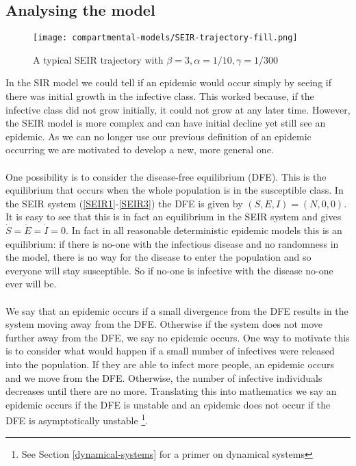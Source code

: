 \subsection{Analysing the model}
\begin{figure}
	\centering
	\texttt{[image: compartmental-models/SEIR-trajectory-fill.png]}
	\caption{A typical SEIR trajectory with $\beta=3,\alpha=1/10,\gamma=1/300$}
\end{figure}
In the SIR model we could tell if an epidemic would occur simply by seeing if there was initial growth in the infective class. This worked because, if the infective class did not grow initially, it could not grow at any later time. However, the SEIR model is more complex and can have initial decline yet still see an epidemic. As we can no longer use our previous definition of an epidemic occurring we are motivated to develop a new, more general one.\\
\\
One possibility is to consider the disease-free equilibrium (DFE). This is the equilibrium that occurs when the whole population is in the susceptible class. In the SEIR system (\ref{SEIR1}-\ref{SEIR3}) the DFE is given by $(S,E,I)=(N,0,0)$. It is easy to see that this is in fact an equilibrium in the SEIR system and gives $\dot S=\dot E=\dot I=0$. In fact in all reasonable deterministic epidemic models this is an equilibrium: if there is no-one with the infectious disease and no randomness in the model, there is no way for the disease to enter the population and so everyone will stay susceptible. So if no-one is infective with the disease no-one ever will be.\\
\\
We say that an epidemic occurs if a small divergence from the DFE results in the system moving away from the DFE. Otherwise if the system does not move further away from the DFE, we say no epidemic occurs. One way to motivate this is to consider what would happen if a small number of infectives were released into the population. If they are able to infect more people, an epidemic occurs and we move from the DFE. Otherwise, the number of infective individuals decreases until there are no more. Translating this into mathematics we say an epidemic occurs if the DFE is unstable and an epidemic does not occur if the DFE is asymptotically unstable \footnote{See Section \ref{dynamical-systems} for a primer on dynamical systems}\cite{models-epidemiology-2}.\label{aa}\\
